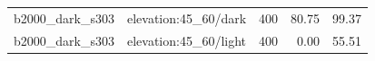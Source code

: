 \begin{longtable}{l>{\raggedright\arraybackslash}p{.42\linewidth}rrr}
b2000\_\allowbreak{}dark\_\allowbreak{}s303 & %
elevation:45\_\allowbreak{}60/dark & %
400 & %
80.75 & %
99.37 \\ %

b2000\_\allowbreak{}dark\_\allowbreak{}s303 & %
elevation:45\_\allowbreak{}60/light & %
400 & %
0.00 & %
55.51 \\ %


\end{longtable}

